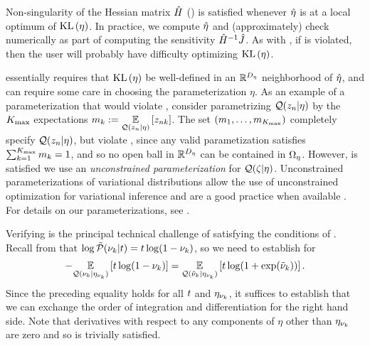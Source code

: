 Non-singularity of the Hessian matrix $\hat{H}$
() is satisfied whenever $\hat\eta$ is at a local
optimum of $\mathrm{KL}\left(\eta\right)$.  In practice, we compute $\hat\eta$ and (approximately)
check  numerically as part of computing the
sensitivity $\hat{H}^{-1} \hat J$.  As with
, if  is
violated, then the user will probably have difficulty optimizing $\mathrm{KL}\left(\eta\right)$.

 essentially requires that $\mathrm{KL}\left(\eta\right)$
be well-defined in an $\mathbb{R}^{D_{\eta}}$ neighborhood of $\hat\eta$, and can
require some care in choosing the parameterization $\eta$.  As an example of a
parameterization that would violate ,
consider parametrizing $\mathcal{Q}(z_{n} \vert \eta)$ by the ${K_{\mathrm{max}}}$ expectations
$m_k := \underset{\mathcal{Q}(z_{n} \vert \eta)}{\mathbb{E}}\left[z_{nk}\right]$.  The set $(m_1, \ldots,
m_{K_{\mathrm{max}}})$ completely specify $\mathcal{Q}(z_{n} \vert \eta)$, but violate
, since any valid parametization
satisfies $\sum_{k=1}^{K_{\mathrm{max}}} m_k = 1$, and so no open ball in
$\mathbb{R}^{D_{\eta}}$ can be contained in $\Omega_{\eta}$.  However,
 is satisfied we use an {\em
unconstrained parameterization} for $\mathcal{Q}(\zeta \vert \eta)$.   Unconstrained
parameterizations of variational distributions allow the use of unconstrained
optimization for variational inference and are a good practice when available
\citep{kucukelbir:2016:advi}.  For details on our parameterizations, see
.

Verifying  is the principal technical challenge of
satisfying the conditions of . Recall from
 that $\log \tilde{\mathcal{P}}(\nu_{k} \vert t) = t \log (1 - \nu_{k})$,
so we need to establish  for
%
\begin{align*}
%
-\expect{\q(\nuk \vert \etanuk)}{t \log (1 - \nuk)} =
\expect{\q(\lnuk \vert \etanuk)}
      {t \log (1 + \exp(\lnuk))}.
%
\end{align*}
%
Since the preceding equality holds for all $t$ and $\eta_{\nu_{k}}$, it suffices to
establish that we can exchange the order of integration and differentiation for
the right hand side.  Note that derivatives with respect to any components of
$\eta$ other than $\eta_{\nu_{k}}$ are zero and so  is
trivially satisfied.

